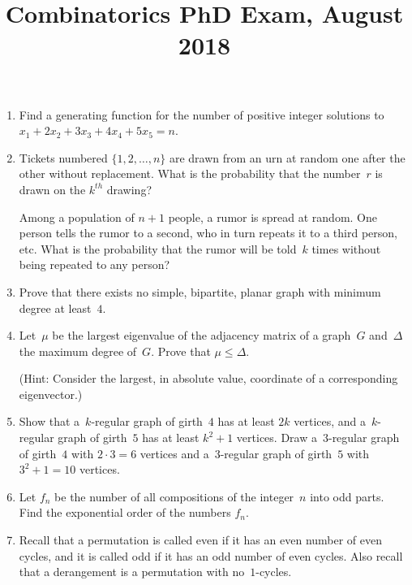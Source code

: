 \documentclass[11pt,letterpaper]{article}
\title{Combinatorics PhD Exam, August 2018}
\author{}
\date{}
\newenvironment{examproblems}[2]{%
  \def\ProblemHeadingTag{#2}%
  \AssignTaggingSocketPlug{block/list/label}{examproblem}%
  \begin{enumerate}%
  \setcounter{enumi}{#1}%
  \renewcommand{\labelenumi}{\textbf{\theenumi.}}%
  \setlength{\topsep}{0.35em}%
  \setlength{\partopsep}{0pt}%
  \setlength{\itemsep}{0.48em}%
  \setlength{\parsep}{0.18em}%
}{\end{enumerate}}
\begin{document}
\maketitle
\thispagestyle{empty}
\begin{examproblems}{0}{H2}
\def\ProblemHeadingText{Problem 1.}
\item
Find a generating function for the number of positive integer solutions to \(x_1+2x_2+3x_3+4x_4+5x_5=n\).
\def\ProblemHeadingText{Problem 2.}
\item
Tickets numbered \(\{1,2,\ldots,n\}\) are drawn from an urn at random one after the other without replacement. What is the probability that the number~\(r\) is drawn on the \(k^{th}\) drawing?

\par
Among a population of \(n+1\) people, a rumor is spread at random. One person tells the rumor to a second, who in turn repeats it to a third person, etc. What is the probability that the rumor will be told~\(k\) times without being repeated to any person?
\def\ProblemHeadingText{Problem 3.}
\item
Prove that there exists no simple, bipartite, planar graph with minimum degree at least~\(4\).
\def\ProblemHeadingText{Problem 4.}
\item
Let~\(\mu\) be the largest eigenvalue of the adjacency matrix of a graph~\(G\) and~\(\Delta\) the maximum degree of~\(G\). Prove that \(\mu\leq\Delta\).

\par
(Hint: Consider the largest, in absolute value, coordinate of a corresponding eigenvector.)
\def\ProblemHeadingText{Problem 5.}
\item
Show that a~\(k\)-regular graph of girth~\(4\) has at least \(2k\) vertices, and a~\(k\)-regular graph of girth~\(5\) has at least \(k^2+1\) vertices. Draw a~\(3\)-regular graph of girth~\(4\) with \(2\cdot 3=6\) vertices and a~\(3\)-regular graph of girth~\(5\) with \(3^2+1=10\) vertices.
\def\ProblemHeadingText{Problem 6.}
\item
Let \(f_n\) be the number of all compositions of the integer~\(n\) into odd parts. Find the exponential order of the numbers \(f_n\).
\def\ProblemHeadingText{Problem 7.}
\item
Recall that a permutation is called even if it has an even number of even cycles, and it is called odd if it has an odd number of even cycles. Also recall that a derangement is a permutation with no~\(1\)-cycles.


\end{examproblems}
\end{document}
